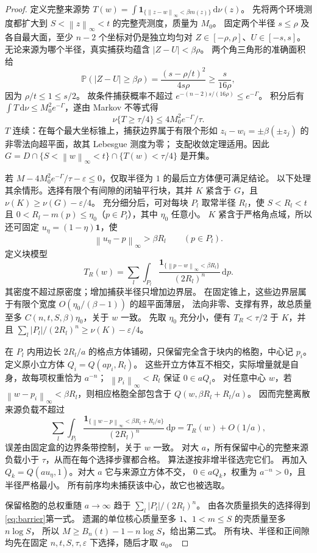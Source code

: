 \documentclass[UTF8,a4paper,11pt,fontset=fandol]{ctexart}
\theoremstyle{remark}
\newcommand{\one}{\mathbf 1}
\newcommand{\norm}[1]{\left\lVert#1\right\rVert}
\newcommand{\dint}{\,\mathrm d}
\begin{document}
\begin{proof}
定义完整来源势
$T(w)=\int\one_{\{\norm{z-w}_\infty<\beta m(z)\}}\dint\nu(z)$。
先将两个环境测度都扩大到 $S<\norm z_\infty<t$ 的完整壳测度，质量为 $M_0$。
固定两个半径 $s\le\rho$ 及各自最大面，至少 $n-2$ 个坐标对仍是独立均匀对
$Z\in[-\rho,\rho]$、$U\in[-s,s]$。
无论来源为哪个半径，真实捕获均蕴含 $|Z-U|<\beta\rho$。
两个角三角形的准确面积给
\[
 \mathbb P(|Z-U|\ge\beta\rho)=\frac{(s-\rho/t)^2}{4s\rho}
 \ge\frac{s}{16\rho},
\]
因为 $\rho/t\le1\le s/2$。
故条件捕获概率不超过 $e^{-(n-2)s/(16\rho)}\le e^{-\Gamma}$。
积分后有 $\int T\dint\nu\le M_0^2e^{-\Gamma}$，遂由 Markov 不等式得
\[
 \nu\{T\ge\tau/4\}\le4M_0^2e^{-\Gamma}/\tau.
\]
$T$ 连续：在每个最大坐标锥上，捕获边界属于有限个形如
$z_i-w_i=\pm\beta(\pm z_j)$ 的非零法向超平面，故其 Lebesgue 测度为零；
支配收敛定理适用。因此
$G=D\cap\{S<\norm w_\infty<t\}\cap\{T(w)<\tau/4\}$ 是开集。

若 $M-4M_0^2e^{-\Gamma}/\tau-\varepsilon\le0$，仅取半径为 $1$ 的最后立方体便可满足结论。
以下处理其余情形。选择有限个有间隙的闭轴平行块，其并 $K$ 紧含于 $G$，且
$\nu(K)\ge\nu(G)-\varepsilon/4$。
充分细分后，可对每块 $P_l$ 取常半径 $R_l$，使
$S<R_l<t$ 且 $0<R_l-m(p)\le\eta_0$（$p\in P_l$），其中 $\eta_0$ 任意小。
$K$ 紧含于严格角点域，所以还可固定 $u_\eta=(1-\eta)\one$，使
\[
 \norm{u_\eta-p}_\infty>\beta R_l\qquad(p\in P_l).
\]
定义块模型
\[
 T_R(w)=\sum_l\int_{P_l}\frac{\one_{\{\norm{p-w}_\infty<\beta R_l\}}}{(2R_l)^n}\dint p.
\]
其密度不超过原密度；增加捕获半径只增加边界层。
在固定锥上，这些边界层属于有限个宽度 $O(\eta_0/(\beta-1))$ 的超平面薄层，
法向非零、支撑有界，故总质量至多 $C(n,t,S,\beta)\eta_0$，关于 $w$ 一致。
先取 $\eta_0$ 充分小，便有 $T_R<\tau/2$ 于 $K$，并且
$\sum_l|P_l|/(2R_l)^n\ge\nu(K)-\varepsilon/4$。

在 $P_l$ 内用边长 $2R_l/a$ 的格点方体铺砌，只保留完全含于块内的格胞，中心记 $p_i$。
定义原小立方体 $Q_i=Q(ap_i,R_l)$。
这些开立方体互不相交，实际增量就是自身，故每项权重恰为 $a^{-n}$；
$\norm{p_i}_\infty<R_l$ 保证 $0\in aQ_i$。
对任意中心 $w$，若 $\norm{w-p_i}_\infty<\beta R_l$，则相应格胞全部包含于
$Q(w,\beta R_l+R_l/a)$。
因而完整离散来源负载不超过
\[
 \sum_l\int_{P_l}\frac{\one_{\{\norm{w-p}_\infty<\beta R_l+R_l/a\}}}{(2R_l)^n}\dint p
 =T_R(w)+O(1/a),
\]
误差由固定盒的边界条带控制，关于 $w$ 一致。
对大 $a$，所有保留中心的完整来源负载小于 $\tau$，从而在每个选择步骤都合格。
算法遂按非增半径选完它们。
再加入 $Q_k=Q(au_\eta,1)$。对大 $a$ 它与来源立方体不交，
$0\in aQ_k$，权重为 $a^{-n}>0$，且半径严格最小。
所有前序均未捕获该中心，故它也被选取。

保留格胞的总权重随 $a\to\infty$ 趋于 $\sum_l|P_l|/(2R_l)^n$。
由各次质量损失的选择得到\eqref{eq:barrier}第一式。
遗漏的单位核心质量至多 $1$、$1<m\le S$ 的壳质量至多 $n\log S$，
所以 $M\ge B_n(t)-1-n\log S$，给出第二式。
所有块、半径和正间隙均先在固定 $n,t,S,\tau,\varepsilon$ 下选择，随后才取 $a_0$。
\end{proof}
\end{document}
